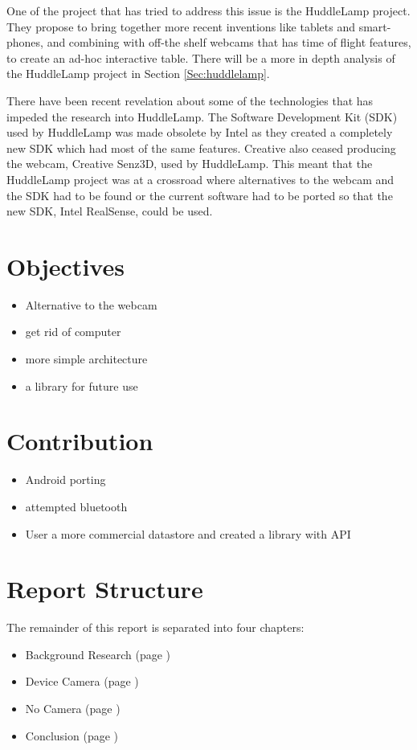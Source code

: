 One of the project that has tried to address this issue is the HuddleLamp project\cite{huddlelamp-paper}. They propose to bring together more recent inventions like tablets and smart-phones, and combining with off-the shelf webcams that has time of flight features, to create an ad-hoc interactive table. There will be a more in depth analysis of the HuddleLamp project in Section \ref{Sec:huddlelamp}.

There have been recent revelation about some of the technologies that has impeded the research into HuddleLamp. The Software Development Kit (SDK) used by HuddleLamp was made obsolete by Intel as they created a completely new SDK which had most of the same features. Creative also ceased producing the webcam, Creative Senz3D, used by HuddleLamp. This meant that the HuddleLamp project was at a crossroad where alternatives to the webcam and the SDK had to be found or the current software had to be ported so that the new SDK, Intel RealSense\cite{intel-realsense}, could be used.




\section{Objectives}

\begin{itemize}
\item Alternative to the webcam
\item get rid of computer
\item more simple architecture
\item a library for future use
\end{itemize}

\section{Contribution}

\begin{itemize}
\item Android porting
\item attempted bluetooth
\item User a more commercial datastore and created a library with API
\end{itemize}

\section{Report Structure}

The remainder of this report is separated into four chapters:
\begin{itemize}
\item Background Research (page \pageref{ch:background})
\item Device Camera (page \pageref{ch:devcamera})
\item No Camera (page \pageref{ch:no_camera})
\item Conclusion (page \pageref{ch:conclusions})
\end{itemize}

